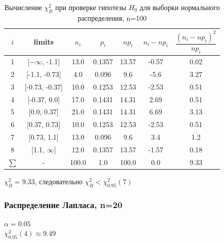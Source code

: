 \begin{table}[H]
	\begin{center}
		\begin{tabular}{|c|c|c|c|c|c|c|}
			\hline
			$i$ & limits & $n_i$ & $p_i$ & $np_i$ & $n_i - np_i$ & $\dfrac{(n_i-np_i)^2}{np_i}$ \\
			\hline
			1 & [$-\infty$, -1.1] & 13.0 & 0.1357 & 13.57 & -0.57 & 0.02 \\
			2 & [-1.1, -0.73] & 4.0 & 0.096 & 9.6 & -5.6 & 3.27 \\
			3 & [-0.73, -0.37] & 10.0 & 0.1253 & 12.53 & -2.53 & 0.51 \\
			4 & [-0.37, 0.0] & 17.0 & 0.1431 & 14.31 & 2.69 & 0.51 \\
			5 & [0.0, 0.37] & 21.0 & 0.1431 & 14.31 & 6.69 & 3.13 \\
			6 & [0.37, 0.73] & 10.0 & 0.1253 & 12.53 & -2.53 & 0.51 \\
			7 & [0.73, 1.1] & 13.0 & 0.096 & 9.6 & 3.4 & 1.2 \\
			8 & [1.1, $\infty$] & 12.0 & 0.1357 & 13.57 & -1.57 & 0.18 \\
			\hline
			$\sum$ & - & 100.0 & 1.0 & 100.0 & 0.0 & 9.33\\
			\hline
		\end{tabular}
	\end{center}
	\caption{Вычисление $\chi_{B}^2$ при проверке гипотезы $H_0$ для выборки нормального распределения, n=100}
\end{table} 

$\chi_{B}^2 = 9.33$, следовательно  $\chi_{B}^2 <\chi^{2}_{0.95}(7)$ \\

\subsubsection{Распределение Лапласа, n=20}

$\alpha = 0.05$ \\
$\chi^{2}_{0.95}(4) \approx 9.49$ \\

